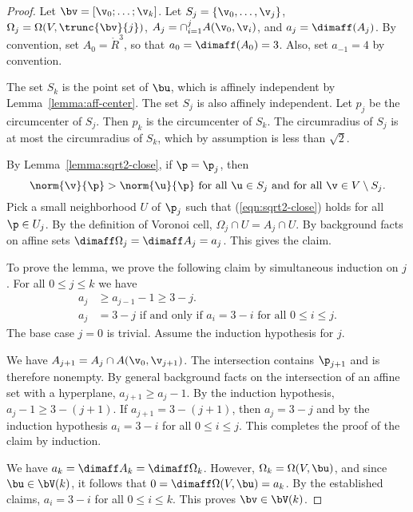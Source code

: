 \begin{proof} 
Let $\bv = [\v_0;\ldots;\v_k]$.  
Let $S_j = \{\v_0,\ldots,\v_j\}$,  
$\Omega_j = \Omega(V,\trunc{\bv}{j})$, 
$A_j=\cap_{i=1}^j A(\v_0,\v_i)$, and $a_j = \dimaff(A_j)$.
By convention, set $A_0 = \ring{R}^3$, so that $a_0=\dimaff(A_0) = 3$.
Also, set $a_{-1} = 4$ by convention.

The set $S_k$ is the point set of $\bu$, which is affinely independent
by Lemma~\ref{lemma:aff-center}.  The set $S_j$ is  also affinely
independent.  Let $p_j$ be the circumcenter of $S_j$.  Then $p_k$ is
the circumcenter of $S_k$.  The circumradius of $S_j$ is at most the
circumradius of $S_k$, which by assumption is less than $\sqrt2$.

By Lemma~\ref{lemma:sqrt2-close}, if $\p=\p_j$, then
\begin{equation}\label{eqn:sqrt2-close} 
\norm{\v}{\p} > \norm{\u}{\p}\text{ for all }\u\in S_j
\text{ and for all }\v\in V\setminus S_j.
\end{equation}   
Pick a small neighborhood $U$ of $\p_j$ such that (\ref{eqn:sqrt2-close}) holds
for all $\p\in U_j$.  By the definition of Voronoi cell, $\Omega_j \cap U=A_j\cap U$.
By background facts on affine sets $\dimaff\Omega_j = \dimaff A_j=a_j$.  This gives
the claim.

To prove the lemma, we prove the following claim by simultaneous induction on $j$.
For all $0\le j\le k$ we have
\begin{align*}
a_j &\ge a_{j-1} - 1\ge 3-j.\\
a_j &= 3-j \text{ if and only if } a_i=3-i \text{ for all } 0\le i\le j.
\end{align*}
The base case $j=0$ is trivial.  Assume the induction hypothesis for $j$.

We have $A_{j+1} = A_{j}\cap A(\v_0,\v_{j+1})$.  The intersection contains $\p_{j+1}$ and is therefore
nonempty.  By general background facts on the intersection of an
affine set with a hyperplane, $a_{j+1} \ge a_{j}-1$.  By the induction hypothesis,
$a_{j}-1\ge 3-(j+1)$.
If $a_{j+1}=3-(j+1)$, then $a_{j}=3-j$ and by the induction hypothesis
$a_{i}=3-i$ for all $0\le i\le j$. This completes the proof of the claim by induction.

We have $a_k = \dimaff A_k=\dimaff \Omega_k$.  However, $\Omega_k=
\Omega(V,\bu)$, and since $\bu\in \bV(k)$, it follows that $0=\dimaff\Omega(V,\bu)=a_k$.
By the established claims, $a_i = 3-i$ for all $0\le i\le k$.  This proves $\bv\in\bV(k)$.


\end{proof}
